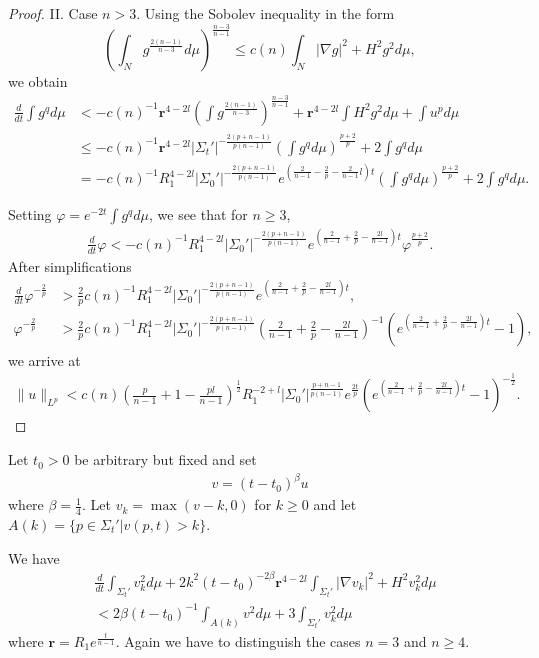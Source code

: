 \documentclass[12pt,twoside]{article}
\theoremstyle{plain}
\theoremstyle{definition}
\theoremstyle{remark}
\newcommand{\vphi}{\varphi}
\newcommand{\na}{\nabla}
\newcommand{\lt}{\left}
\newcommand{\rt}{\right}
\newcommand{\mr}{\mathbf{r}}
\numberwithin{equation}{section}
\begin{document}
\begin{proof}
II. Case $n>3$. Using the Sobolev inequality in the form
\[ \lt( \int_{N} g^{\frac{2(n-1)}{n-3}} d\mu \rt)^{\frac{n-3}{n-1}} \le c(n) \int_{N} |\na g|^2 + H^2 g^2 d\mu,\] we obtain
\begin{align*}
\frac{d}{dt} \int g^q d\mu &< - c(n)^{-1} \mr^{4-2l} \lt(\int g^{\frac{2(n-1)}{n-3}} \rt)^{\frac{n-3}{n-1}} + \mr^{4-2l} \int H^2 g^2 d\mu + \int u^p d\mu \\
&\le - c(n)^{-1} \mr^{4-2l} |\Sigma_t'|^{-\frac{2(p+n-1)}{p(n-1)}} \lt( \int g^q d\mu \rt)^{\frac{p+2}{p}} +2 \int g^q d\mu \\
&= -c(n)^{-1} R_1^{4-2l} |\Sigma_0'|^{-\frac{2(p+n-1)}{p(n-1)}} e^{\lt( \frac{2}{n-1} - \frac{2}{p} - \frac{2}{n-1}l\rt)t } \lt( \int g^q d\mu \rt)^{\frac{p+2}{p}} + 2 \int g^q d\mu.
\end{align*}

Setting $\vphi = e^{-2t} \int g^q d\mu$, we see that for $n \ge 3$,
\begin{align*}
\frac{d}{dt}\vphi < -c(n)^{-1} R_1^{4-2l} |\Sigma_0'|^{-\frac{2(p+n-1)}{p(n-1)}} e^{\lt( \frac{2}{n-1} + \frac{2}{p} -\frac{2l}{n-1} \rt)t } \vphi^{\frac{p+2}{p}}.
\end{align*}
After simplifications
\begin{align*}
\frac{d}{dt}\vphi^{-\frac{2}{p}} &>  \frac{2}{p}c(n)^{-1} R_1^{4-2l} |\Sigma_0'|^{-\frac{2(p+n-1)}{p(n-1)}} e^{(\frac{2}{n-1}+\frac{2}{p} - \frac{2l}{n-1})t},\\
\vphi^{-\frac{2}{p}} &> \frac{2}{p}c(n)^{-1} R_1^{4-2l} |\Sigma_0'|^{-\frac{2(p+n-1)}{p(n-1)}} \lt( \frac{2}{n-1} + \frac{2}{p} - \frac{2l}{n-1} \rt)^{-1} \lt( e^{(\frac{2}{n-1}+\frac{2}{p} - \frac{2l}{n-1})t} - 1 \rt),
\end{align*}
we arrive at
\begin{align*}
\| u\|_{L^p} < c(n) (\frac{p}{n-1}+1 - \frac{pl}{n-1})^{\frac{1}{2}}  R_1^{-2+l} |\Sigma_0'|^{\frac{p+n-1}{p(n-1)}} e^{\frac{2t}{p}} \lt( e^{(\frac{2}{n-1}+\frac{2}{p} - \frac{2l}{n-1})t} - 1 \rt)^{-\frac{1}{2}}.
\end{align*}
\end{proof}


Let $t_0 > 0$ be arbitrary but fixed and set \begin{align*}
v = (t-t_0)^\beta u
\end{align*}
where $\beta = \frac{1}{4}$. Let $v_k = \max(v-k,0)$ for $k \ge 0$ and let $A(k) = \{ p \in \Sigma_t' | v(p,t) > k \}$.

We have
\begin{align*}
&\frac{d}{dt} \int_{\Sigma_t'} v_k^2 d\mu + 2k^2 (t-t_0)^{-2\beta} \mr^{4-2l} \int_{\Sigma_t'} |\na v_k|^2 + H^2 v_k^2 d\mu \\
&< 2\beta (t-t_0)^{-1} \int_{A(k)} v^2 d\mu + 3 \int_{\Sigma_t'} v_k^2 d\mu 
\end{align*} 
where $\mr = R_1 e^{\frac{t}{n-1}}$. Again we have to distinguish the cases $n=3$ and $n \ge 4$.
\end{document}
